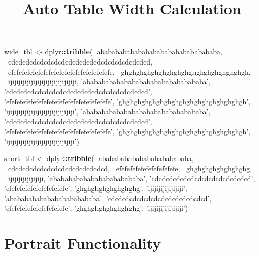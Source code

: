 \documentclass[]{article}
\title{Auto Table Width Calculation}
\author{}
\date{\vspace{-2.5em}}
\newenvironment{Shaded}{\begin{snugshade}}{\end{snugshade}}
\newcommand{\KeywordTok}[1]{\textcolor[rgb]{0.13,0.29,0.53}{\textbf{#1}}}
\newcommand{\NormalTok}[1]{#1}
\newcommand{\OperatorTok}[1]{\textcolor[rgb]{0.81,0.36,0.00}{\textbf{#1}}}
\newcommand{\StringTok}[1]{\textcolor[rgb]{0.31,0.60,0.02}{#1}}
\begin{document}
\maketitle

\begin{Shaded}
\begin{Highlighting}[]
\NormalTok{  wide_tbl <-}\StringTok{ }\NormalTok{dplyr}\OperatorTok{::}\KeywordTok{tribble}\NormalTok{(}\OperatorTok{~}\NormalTok{ababababababababababababababababa, }\OperatorTok{~}\NormalTok{cdcdcdcdcdcdcdcdcdcdcdcdcdcdcdcdcdcdcdcd, }\OperatorTok{~}\NormalTok{efefefefefefefefefefefefefefefefefefefe, }\OperatorTok{~}\NormalTok{ghghghghghghghghghghghghghghghghgh, }\OperatorTok{~}\NormalTok{ijijijijijijijijijijijijijijijiji,}
                             \StringTok{'ababababababababababababababababa'}\NormalTok{, }\StringTok{'cdcdcdcdcdcdcdcdcdcdcdcdcdcdcdcdcdcdcdcd'}\NormalTok{, }\StringTok{'efefefefefefefefefefefefefefefefefefefe'}\NormalTok{, }\StringTok{'ghghghghghghghghghghghghghghghghgh'}\NormalTok{, }\StringTok{'ijijijijijijijijijijijijijijijiji'}\NormalTok{,}
                             \StringTok{'ababababababababababababababababa'}\NormalTok{, }\StringTok{'cdcdcdcdcdcdcdcdcdcdcdcdcdcdcdcdcdcdcdcd'}\NormalTok{, }\StringTok{'efefefefefefefefefefefefefefefefefefefe'}\NormalTok{, }\StringTok{'ghghghghghghghghghghghghghghghghgh'}\NormalTok{, }\StringTok{'ijijijijijijijijijijijijijijijiji'}\NormalTok{)}

\NormalTok{  short_tbl <-}\StringTok{ }\NormalTok{dplyr}\OperatorTok{::}\KeywordTok{tribble}\NormalTok{(}\OperatorTok{~}\NormalTok{ababababababababababababa, }\OperatorTok{~}\NormalTok{cdcdcdcdcdcdcdcdcdcdcdcdcdcd, }\OperatorTok{~}\NormalTok{efefefefefefefefefefefe, }\OperatorTok{~}\NormalTok{ghghghghghghghghg, }\OperatorTok{~}\NormalTok{ijijijijijijijiji,}
                              \StringTok{'ababababababababababababa'}\NormalTok{, }\StringTok{'cdcdcdcdcdcdcdcdcdcdcdcdcdcd'}\NormalTok{, }\StringTok{'efefefefefefefefefefefe'}\NormalTok{, }\StringTok{'ghghghghghghghghg'}\NormalTok{, }\StringTok{'ijijijijijijijiji'}\NormalTok{,}
                              \StringTok{'ababababababababababababa'}\NormalTok{, }\StringTok{'cdcdcdcdcdcdcdcdcdcdcdcdcdcd'}\NormalTok{, }\StringTok{'efefefefefefefefefefefe'}\NormalTok{, }\StringTok{'ghghghghghghghghg'}\NormalTok{, }\StringTok{'ijijijijijijijiji'}\NormalTok{)}
\end{Highlighting}
\end{Shaded}

\hypertarget{portrait-functionality}{%
\section{Portrait Functionality}\label{portrait-functionality}}
\end{document}
